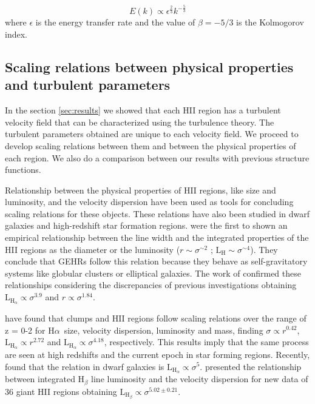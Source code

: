 \documentclass[fleqn,usenatbib, useAMS, a4paper]{mnras}
\newcommand\halpha{H${\alpha}$}
\begin{document}
\begin{equation}\label{eq:kolm}
E(k) \propto \epsilon^\frac{2}{3} k^{-\frac{5}{3}}
\end{equation}
%
where \(\epsilon\) is the energy transfer rate and the value of \(\beta = -5 / 3\) is the Kolmogorov index.

\subsection{Scaling relations between physical properties and turbulent parameters}

In the section \ref{sec:results} we showed that each HII region has a turbulent velocity field that can be characterized using the turbulence theory.
The turbulent parameters obtained are unique to each velocity field.
We proceed to develop scaling relations between them and between the physical properties of each region.
We also do a comparison between our results with previous structure functions.

Relationship between the physical properties of HII regions, like size and luminosity, and the velocity dispersion have been used as tools for concluding scaling relations for these objects.
These relations have also been studied in dwarf galaxies and high-redshift star formation regions.
\citet{melnick1977,terlevich1981} were the first to shown an empirical relationship between the line width and the integrated properties of the HII regions as the diameter or the luminosity ($r \sim \sigma ^{\sim 2}$ ; $\text{L}_{\text{H}} \sim \sigma ^{\sim 4}$).
They conclude that GEHRs follow this relation because they behave as self-gravitatory systems like globular clusters or elliptical galaxies.
The work of \citet{1988A&A...201..199A} confirmed these relationships considering the discrepancies of previous investigations obtaining \(\text{L}_{\text{H}_{\alpha}} \propto \sigma^{3.9}\) and \(r \propto \sigma^{1.84}\).

\citet{2012MNRAS.422.3339W} have found that clumps and HII regions follow scaling relations over the range of z = 0-2 for \halpha\ size, velocity dispersion, luminosity and mass, finding \(\sigma \propto r^{0.42}\), \(\text{L}_{\text{H}_{\alpha}} \propto r^{2.72}\) and \(\text{L}_{\text{H}_{\alpha}} \propto \sigma^{4.18}\), respectively. 
This results imply that the same process are seen at high redshifts and the current epoch in star forming regions.
Recently, \citet{Moiseev:2015a} found that the relation in dwarf galaxies is \(\text{L}_{\text{H}_{\alpha}} \propto \sigma^{5}\).
\citet{2018MNRAS.474.1250F} presented the relationship between integrated H$_{\beta}$ line luminosity and the velocity dispersion for new data of 36 giant HII regions obtaining \(\text{L}_{\text{H}_{\beta}} \propto \sigma^{5.02 \pm 0.21}\).
\end{document}
